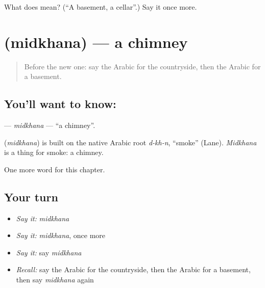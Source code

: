 \begin{tcolorbox}[breakable,colback=teal!4,colframe=teal!35!black,title={Before you move on}]
What does  mean? (\textquotedblleft{}A basement, a cellar\textquotedblright{}.) Say it once more.
\end{tcolorbox}
\section[\texorpdfstring{\ar{مدخنة} (midkhana)}{مدخنة (midkhana)}]{ (midkhana) — a chimney}

\label{lesson:AR-C266-midkhana}



\begin{quote}
Before the new one: say the Arabic for the countryside, then the Arabic for a basement.
\end{quote}

\subsection*{You'll want to know: }
\textbf{} — \emph{midkhana} — \textquotedblleft{}a chimney\textquotedblright{}.

\begin{cousinweb}
\textbf{} (\emph{midkhana}) is built on the native Arabic root \emph{d-kh-n}, \textquotedblleft{}smoke\textquotedblright{} (Lane). \emph{Midkhana} is a thing for smoke: a chimney.
\end{cousinweb}

\begin{grammarlens}[title={What you've built}]
One more word for this chapter.
\end{grammarlens}

\subsection*{Your turn}
\begin{itemize}
\raggedright
  \item \emph{Say it:} \emph{midkhana}
  \item \emph{Say it:} \emph{midkhana}, once more
  \item \emph{Say it:} say \emph{midkhana}
  \item \emph{Recall:} say the Arabic for the countryside, then the Arabic for a basement, then say \emph{midkhana} again
\end{itemize}

